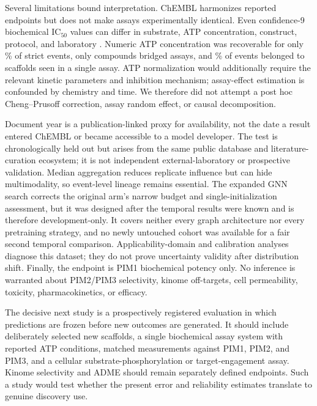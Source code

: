 \documentclass[11pt]{article}
\begin{document}
Several limitations bound interpretation. ChEMBL harmonizes reported endpoints
but does not make assays experimentally identical. Even confidence-9 biochemical
IC$_{50}$ values can differ in substrate, ATP concentration, construct, protocol,
and laboratory \citep{landrum2024noise,nelen2025matched}. Numeric ATP concentration was recoverable for only
\NumericATPEventPercent{}\% of strict events, only \CrossAssayCompoundCount{}
compounds bridged assays, and \AssayExclusiveScaffoldEventPercent{}\% of events
belonged to scaffolds seen in a single assay. ATP normalization would additionally
require the relevant kinetic parameters and inhibition mechanism; assay-effect
estimation is confounded by chemistry and time. We therefore did not attempt a
post hoc Cheng--Prusoff correction, assay random effect, or causal decomposition.

Document year is a publication-linked proxy for availability, not the date a
result entered ChEMBL or became accessible to a model developer. The test is
chronologically held out but arises from the same public database and
literature-curation ecosystem; it is not independent external-laboratory or
prospective validation. Median aggregation reduces replicate influence but can
hide multimodality, so event-level lineage remains essential. The expanded GNN
search corrects the original arm's narrow budget and single-initialization
assessment, but it was designed after the temporal results were known and is
therefore development-only. It covers neither every graph architecture nor every
pretraining strategy, and no newly untouched cohort was available for a fair
second temporal comparison.
Applicability-domain and calibration analyses diagnose this dataset; they do not
prove uncertainty validity after distribution shift. Finally, the endpoint is
PIM1 biochemical potency only. No inference is warranted about PIM2/PIM3
selectivity, kinome off-targets, cell permeability, toxicity, pharmacokinetics,
or efficacy.

The decisive next study is a prospectively registered evaluation in which
predictions are frozen before new outcomes are generated. It should include
deliberately selected new scaffolds, a single biochemical assay system with
reported ATP conditions, matched measurements against PIM1, PIM2, and PIM3, and
a cellular substrate-phosphorylation or target-engagement assay. Kinome
selectivity and ADME should remain separately defined endpoints. Such a study
would test whether the present error and reliability estimates translate to
genuine discovery use.
\end{document}
